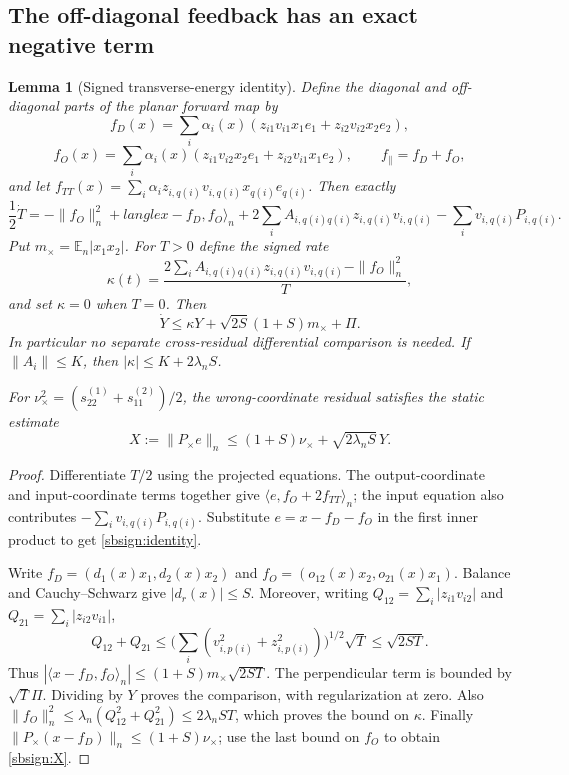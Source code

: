 \documentclass{article} %
\theoremstyle{plain}
\newtheorem{lemma}[theorem]{Lemma}
\theoremstyle{definition}
\theoremstyle{remark}
\begin{document}
\subsection{The off-diagonal feedback has an exact negative term}
\begin{lemma}[Signed transverse-energy identity]
\label{sbsign:energy}
Define the diagonal and off-diagonal parts of the planar forward map by
\[
 f_D(x)=\sum_i\alpha_i(x)
   (z_{i1}v_{i1}x_1e_1+z_{i2}v_{i2}x_2e_2),
\]
\[
 f_O(x)=\sum_i\alpha_i(x)
   (z_{i1}v_{i2}x_2e_1+z_{i2}v_{i1}x_1e_2),
 \qquad f_\parallel=f_D+f_O,
\]
and let $f_{TT}(x)=\sum_i\alpha_i z_{i,q(i)}v_{i,q(i)}x_{q(i)}e_{q(i)}$.
Then exactly
\begin{equation}\label{sbsign:identity}
 \frac12\dot T=-\|f_O\|_n^2+langle x-f_D,f_O\rangle_n
       +2\sum_i A_{i,q(i)q(i)}z_{i,q(i)}v_{i,q(i)}
       -\sum_i v_{i,q(i)}P_{i,q(i)}.
\end{equation}
Put $m_\times=\mathbb E_n|x_1x_2|$. For $T>0$ define the signed rate
\[
 \kappa(t)=\frac{2\sum_i A_{i,q(i)q(i)}z_{i,q(i)}v_{i,q(i)}
                         -\|f_O\|_n^2}{T},
\]
and set $\kappa=0$ when $T=0$. Then
\begin{equation}\label{sbsign:Y}
 \dot Y\le\kappa Y+\sqrt{2S}(1+S)m_\times+\Pi.
\end{equation}
In particular no separate cross-residual differential comparison is needed.
If $\|A_i\|\le K$, then $|\kappa|\le K+2\lambda_nS$.

For $\nu_\times^2=(s_{22}^{(1)}+s_{11}^{(2)})/2$,
the wrong-coordinate residual satisfies the static estimate
\begin{equation}\label{sbsign:X}
 X:=\|P_\times e\|_n
 \le(1+S)\nu_\times+\sqrt{2\lambda_n S}\,Y.
\end{equation}
\end{lemma}
\begin{proof}
Differentiate $T/2$ using the projected equations. The output-coordinate
and input-coordinate terms together give
$\langle e,f_O+2f_{TT}\rangle_n$; the input equation also contributes
$-\sum_i v_{i,q(i)}P_{i,q(i)}$.
Substitute $e=x-f_D-f_O$ in the first inner product to get
\eqref{sbsign:identity}.

Write $f_D=(d_1(x)x_1,d_2(x)x_2)$ and
$f_O=(o_{12}(x)x_2,o_{21}(x)x_1)$. Balance and Cauchy--Schwarz give
$|d_r(x)|\le S$. Moreover, writing
$Q_{12}=\sum_i|z_{i1}v_{i2}|$ and $Q_{21}=\sum_i|z_{i2}v_{i1}|$,
\[
 Q_{12}+Q_{21}\le
 \Big(\sum_i(v_{i,p(i)}^2+z_{i,p(i)}^2)\Big)^{1/2}\sqrt T
 \le\sqrt{2ST}.
\]
Thus $|\langle x-f_D,f_O\rangle_n|
\le(1+S)m_\times\sqrt{2ST}$.
The perpendicular term is bounded by $\sqrt T\Pi$. Dividing by $Y$
proves the comparison, with regularization at zero.
Also $\|f_O\|_n^2\le\lambda_n(Q_{12}^2+Q_{21}^2)\le2\lambda_nST$,
which proves the bound on $\kappa$.
Finally $\|P_\times(x-f_D)\|_n\le(1+S)\nu_\times$; use the last bound
on $f_O$ to obtain \eqref{sbsign:X}.
\end{proof}
\end{document}
